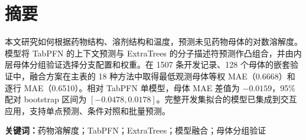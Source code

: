 \section*{摘要}
本文研究如何根据药物结构、溶剂结构和温度，预测未见药物母体的对数溶解度。模型将 TabPFN 的上下文预测与 ExtraTrees 的分子描述符预测作凸组合，并由内层母体分组验证选择分支配置和权重。在 1507 条开发记录、128 个母体的嵌套验证中，融合方案在主表的 18 种方法中取得最低观测母体等权 MAE（0.6668）和逐行 MAE（0.6510）。相对 TabPFN 单模型，母体 MAE 差值为 $-0.0159$，95\% 配对 bootstrap 区间为 $[-0.0478,0.0178]$。完整开发集拟合的模型已集成到交互应用，支持单点预测、条件对照和批量预测。

\noindent\textbf{关键词：}药物溶解度；TabPFN；ExtraTrees；模型融合；母体分组验证
